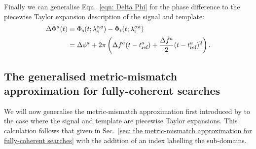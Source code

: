 \documentclass[../full_thesis/full_thesis.tex]{subfiles}
\begin{document}
Finally we can generalise Eqn.~\eqref{eqn: Delta Phi} for the phase difference
to the piecewise Taylor expansion description of the signal and template:
\begin{align}
\begin{split}
\Delta\Phi^{a}(t)& =  \Phi_{\textrm{s}}(t; {\lambda}_\textrm{s}^{\alpha a}) - \Phi_{\textrm{t}}(t; {\lambda}_\textrm{t}^{\alpha a})\\
& = \Delta\phi^{a} + 2\pi\left(\Delta f^{a}(t-t_{\textrm{ref}}^{a})
+ \frac{\Delta\dot{f}^{a}}{2}(t - t_{\textrm{ref}}^{a})^{2}\right).
\end{split}
\end{align}

\subsection{The generalised metric-mismatch approximation for fully-coherent
            searches}

We will now generalise the metric-mismatch approximation first introduced by
\citet{Brady1998} to the case where the signal and template are piecewise
Taylor expansions. This calculation follows that given in Sec.~\ref{sec: the
metric-mismatch approximation for fully-coherent searches} with the addition
of an index labelling the sub-domains.
\end{document}
